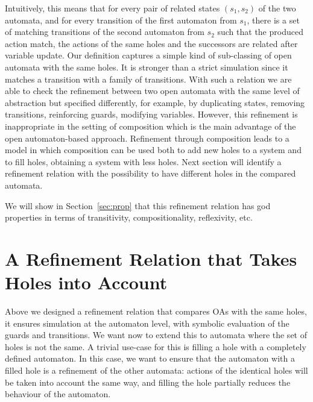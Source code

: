 \documentclass[runningheads]{llncs}
\begin{document}
Intuitively, this means that for every pair of related
states $(s_1,s_2)$  of the two automata, and for every  transition of the first automaton from $s_1$, there is a set of matching transitions  of the second automaton  from $s_2$ such that the produced action match, the actions of the same holes and the successors are related after variable update. Our definition captures a simple kind of sub-classing of open automata with the same holes. It is stronger than a strict simulation since it matches a transition with a family of transitions. 
With such a relation we are able to check the refinement between two open automata with the same level of abstraction but specified differently, for example, by duplicating states, removing transitions,  reinforcing  guards, modifying variables. 
However, this refinement is inappropriate in the setting of composition which is the main advantage of the open automaton-based approach. 
Refinement through composition  leads to a model in which composition can be used both to add new holes to a system and to fill holes, obtaining a system with less holes.
Next section will identify a refinement relation with the possibility to have different holes in the compared automata.





 We will show in Section~\ref{sec:prop} that this refinement relation has god properties in terms of transitivity, compositionality, reflexivity, etc.


\section{A Refinement Relation that Takes Holes into Account}\label{sec:holes}

Above we designed a refinement relation that compares OAs with the same holes, it ensures simulation at the automaton level, with symbolic evaluation of the guards and transitions. We want now to extend this to automata where the set of holes is not the same. A trivial use-case for this is filling a hole with a completely defined automaton. In this case, we want to ensure that the automaton with a filled hole is a refinement of the other automata: actions of the identical holes will be taken into account the same way, and filling the hole partially reduces the behaviour of the automaton.
\end{document}
